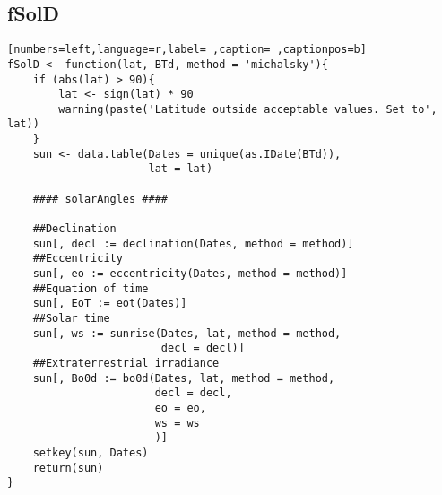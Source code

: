 \subsection{fSolD}
\label{sec:org47fab43}
\begin{lstlisting}[numbers=left,language=r,label= ,caption= ,captionpos=b]
fSolD <- function(lat, BTd, method = 'michalsky'){
    if (abs(lat) > 90){
        lat <- sign(lat) * 90
        warning(paste('Latitude outside acceptable values. Set to', lat))
    }
    sun <- data.table(Dates = unique(as.IDate(BTd)),
                      lat = lat)

    #### solarAngles ####

    ##Declination
    sun[, decl := declination(Dates, method = method)]
    ##Eccentricity
    sun[, eo := eccentricity(Dates, method = method)]
    ##Equation of time
    sun[, EoT := eot(Dates)]
    ##Solar time
    sun[, ws := sunrise(Dates, lat, method = method,
                        decl = decl)]
    ##Extraterrestrial irradiance
    sun[, Bo0d := bo0d(Dates, lat, method = method,
                       decl = decl,
                       eo = eo,
                       ws = ws
                       )]
    setkey(sun, Dates)
    return(sun)
}
\end{lstlisting}

